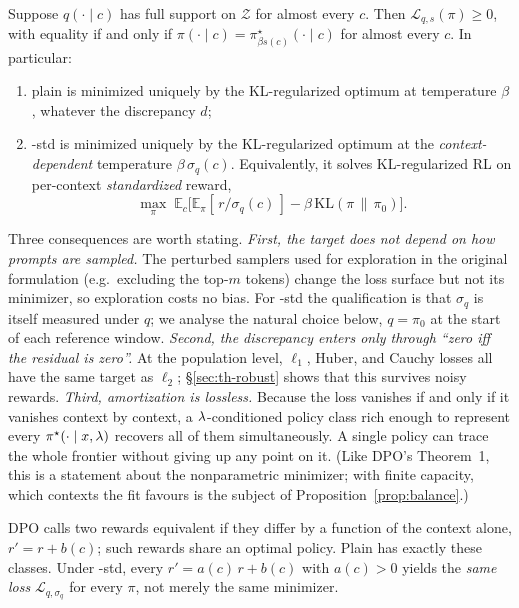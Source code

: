\begin{theorem}
\label{thm:consistency}
Suppose $q(\cdot\mid c)$ has full support on $\mathcal{Z}$ for almost every $c$.
Then $\mathcal{L}_{q,s}(\pi) \ge 0$, with equality if and only if
$\pi(\cdot\mid c) = \pi^\star_{\beta s(c)}(\cdot\mid c)$ for almost every $c$.
In particular:
\begin{enumerate}[label=(\roman*),itemsep=1pt,topsep=2pt]
  \item plain \rrebel{} is minimized uniquely by the KL-regularized optimum at
        temperature $\beta$, whatever the discrepancy $d$;
  \item \rrebel{}-std is minimized uniquely by the KL-regularized optimum at the
        \emph{context-dependent} temperature $\beta\,\sigma_q(c)$. Equivalently,
        it solves KL-regularized RL on per-context \emph{standardized} reward,
        \[
          \max_\pi\; \mathbb{E}_c\bigl[\mathbb{E}_{\pi}[\,r/\sigma_q(c)\,]
          - \beta\,\mathrm{KL}(\pi\,\|\,\pi_0)\bigr].
        \]
\end{enumerate}
\end{theorem}

Three consequences are worth stating.
\emph{First, the target does not depend on how prompts are sampled.} The
perturbed samplers used for exploration in the original \rrebel{}
formulation (e.g.\ excluding the top-$m$ tokens) change the loss surface but
not its minimizer, so exploration costs no bias. For \rrebel{}-std the
qualification is that $\sigma_q$ is itself measured under $q$; we analyse the
natural choice below, $q = \pi_0$ at the start of each reference window.
\emph{Second, the discrepancy enters only through ``zero iff the residual is
zero''.} At the population level, $\ell_1$, Huber, and Cauchy losses all have the
same target as $\ell_2$; \S\ref{sec:th-robust} shows that this survives noisy
rewards.
\emph{Third, amortization is lossless.} Because the loss vanishes if and only if
it vanishes context by context, a $\lambda$-conditioned policy class rich enough to
represent every $\pi^\star(\cdot\mid x,\lambda)$ recovers all of them
simultaneously. A single policy can trace the whole frontier without giving up
any point on it. (Like DPO's Theorem~1, this is a statement about the
nonparametric minimizer; with finite capacity, which contexts the fit favours
is the subject of Proposition~\ref{prop:balance}.)

\begin{lemma}
\label{lem:invariance}
DPO calls two rewards equivalent if they differ by a function of the context
alone, $r' = r + b(c)$; such rewards share an optimal policy. Plain \rrebel{}
has exactly these classes. Under \rrebel{}-std, every
$r' = a(c)\,r + b(c)$ with $a(c) > 0$ yields the \emph{same loss}
$\mathcal{L}_{q,\sigma_q}$ for every $\pi$, not merely the same minimizer.
\end{lemma}

